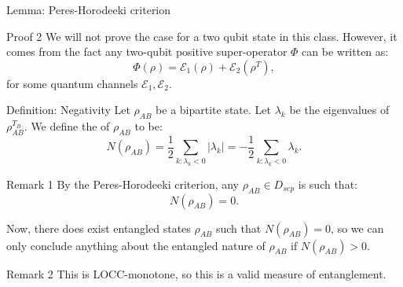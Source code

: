 \documentclass[a4paper]{article}
\begin{document}
\begin{parag}{Lemma: Peres-Horodeeki criterion}
    \begin{subparag}{Proof 2}
        We will not prove the case for a two qubit state in this class. However, it comes from the fact any two-qubit positive super-operator $\Phi$ can be written as:
        \[\Phi\left(\rho\right) = \mathcal{E}_1\left(\rho\right) + \mathcal{E}_2\left(\rho^T\right),\]
        for some quantum channels $\mathcal{E}_1, \mathcal{E}_2$.
    \end{subparag}
\end{parag}

\begin{parag}{Definition: Negativity}
    Let $\rho_{AB}$ be a bipartite state. Let $\lambda_k$ be the eigenvalues of $\rho_{AB}^{T_B}$. We define the  of $\rho_{AB}$ to be:
    \[N\left(\rho_{AB}\right) = \frac{1}{2} \sum_{k : \lambda_k < 0} \left|\lambda_k\right| = -\frac{1}{2} \sum_{k: \lambda_k < 0} \lambda_k.\]

    \begin{subparag}{Remark 1}
        By the Peres-Horodeeki criterion, any $\rho_{AB} \in D_{sep}$ is such that: 
        \[N\left(\rho_{AB}\right) = 0.\]
        
        Now, there does exist entangled states $\rho_{AB}$ such that $N\left(\rho_{AB}\right) = 0$, so we can only conclude anything about the entangled nature of $\rho_{AB}$ if $N\left(\rho_{AB}\right) > 0$.
    \end{subparag}

    \begin{subparag}{Remark 2}
        This is LOCC-monotone, so this is a valid measure of entanglement.
    \end{subparag}
\end{parag}
\end{document}
